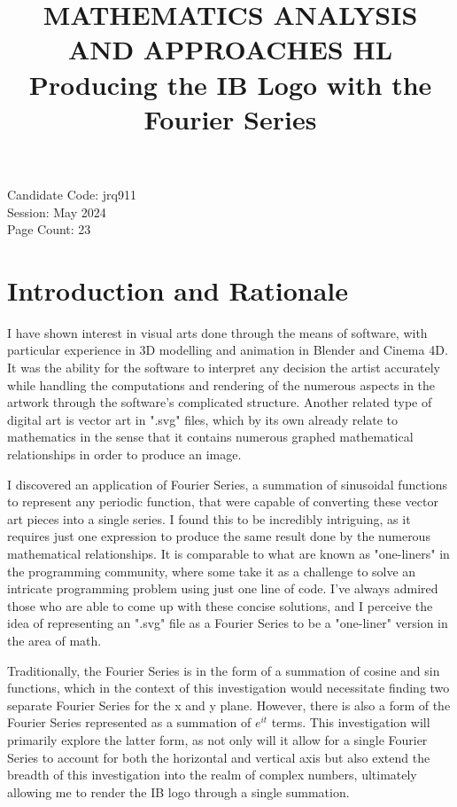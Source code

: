 \documentclass[letterpaper, 12pt]{article}
\title{MATHEMATICS ANALYSIS AND APPROACHES HL
\\
Producing the IB Logo with the Fourier Series}
\author{}
\date{}
\begin{document}
\nocite{*}

\maketitle
\begin{center}
    Candidate Code: jrq911
    \\
    Session: May 2024
    \\
    Page Count: 23
\end{center}
\newpage

\tableofcontents
\newpage


\setcounter{page}{1}

\section{Introduction and Rationale}

I have shown interest in visual arts done through the means of software,
with particular experience in 3D modelling and animation in Blender
and Cinema 4D. It was the ability for the software to interpret
any decision the artist accurately while handling the computations
and rendering of the numerous aspects in the artwork through the
software's complicated structure.
Another related type of digital art is vector art in ".svg" files, which
by its own already relate
to mathematics in the sense that it contains numerous graphed mathematical
relationships in order to produce an image.

I discovered an application of Fourier Series,
a summation of sinusoidal functions to represent any periodic function, that were capable of converting
these vector art pieces into a single series.
I found this to be incredibly intriguing, as it
requires just one expression to produce the same result done by the numerous mathematical
relationships. It is comparable to what are known as "one-liners"
in the programming community, where some take it as a challenge to
solve an intricate programming problem
using just one line of code. I've always admired those
who are able to come up with these concise solutions, and I
perceive the idea of representing an ".svg" file as a Fourier Series
to be a "one-liner" version in the area of math.

Traditionally, the Fourier Series is in the form of a summation
of cosine and sin functions, which in the context of this investigation
would necessitate finding two separate Fourier Series for the
x and y plane. However, there is also a form of the Fourier Series
represented as a summation of \(e^{it}\) terms. This
investigation will primarily explore the latter form, as not only
will it allow for a single Fourier Series to account
for both the horizontal and vertical axis but also extend
the breadth of this investigation into the realm of
complex numbers, ultimately allowing me
to render the IB logo through a single summation.
\end{document}
